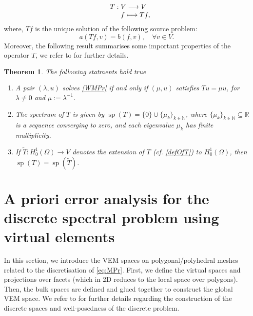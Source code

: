 \documentclass[final,reqno]{elsarticle}
\newtheorem{theorem}{Theorem}[section]
\DeclareMathOperator{\spec}{sp}
\begin{document}
\begin{equation*}
    \begin{array}{rl}
&T:V\longrightarrow V  \\
& \hspace*{0.55cm} f \longmapsto  Tf,     
    \end{array}
\end{equation*}
where, $Tf$ is the unique solution of the following source problem:
\begin{equation}\label{defOfT}
a(Tf,v)=b(f,v),\quad \forall v\in V.
\end{equation}
Moreover, the following result summarises some important properties of the operator $T$, we refer to \cite{dassi2025posteriorierrorestimatesc1,MoraVelasquez2020} for further details.
\begin{theorem} The following statments hold true
\begin{enumerate}
    \item[(i)] A pair $(\lambda,u)$ solves \eqref{WMPr} if and only if $(\mu,u)$ satisfies $Tu = \mu u$, for $\lambda \neq 0$ and $\mu := \lambda^{-1}$.
    \item[(ii)] The spectrum of $T$  is given by $
\spec(T)=\{0 \}\cup \{ \mu_k\}_{k\in \mathbb{N}}$, where $\{ \mu_k\}_{k\in \mathbb{N}}\subseteq \mathbb{R}$ is a sequence converging to zero, and each eigenvalue $\mu_k$ has finite multiplicity.
\item[(iii)] If $\widetilde{T}:H_0^1(\Omega)\longrightarrow V$ denotes the extension of $T$ (cf. \eqref{defOfT}) to $H_0^1(\Omega)$, then $\spec(T)=\spec(\widetilde{T})$.
\end{enumerate}
\end{theorem}


\setcounter{equation}{0}
\section{A priori error analysis for the discrete spectral problem using virtual elements
}
\label{SEC:DISCRETE}
In this section, we introduce the VEM spaces on polygonal/polyhedral meshes related to the discretisation of \eqref{eq:MPr}. First, we define the virtual spaces and projections over facets (which in 2D reduces to the local space over polygons). Then, the bulk spaces are defined and glued together to construct the global VEM space. We refer to \cite{ABSV2016,BDR2019C1Polyhedral} for further details regarding the construction of the discrete spaces and well-posedness of the discrete problem.
\end{document}
